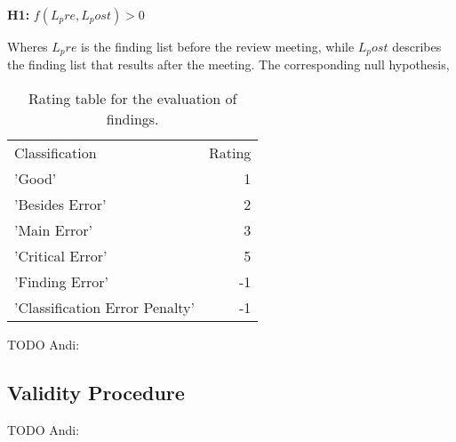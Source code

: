 \begin{center}
\textbf{H1:} $f(L_pre, L_post) > 0$
\end{center}

Wheres $L_pre$ is the finding list before the review meeting, while $L_post$ describes the finding list that results after the meeting.
The corresponding null hypothesis, 

\begin{table}
\centering
\begin{tabular}{lr}
  \rowcolor{heading}Classification & Rating \\
  \rowcolor{a}'Good' & 1 \\
  \rowcolor{b}'Besides Error' & 2 \\
  \rowcolor{a}'Main Error' & 3 \\
  \rowcolor{b}'Critical Error' & 5 \\
  \rowcolor{a}'Finding Error' & -1 \\
  \rowcolor{b}'Classification Error Penalty' & -1 \\
\end{tabular}
\caption{Rating table for the evaluation of findings.}
\label{tab:ratings}
\end{table}

TODO Andi:

\subsection{Validity Procedure}

TODO Andi: